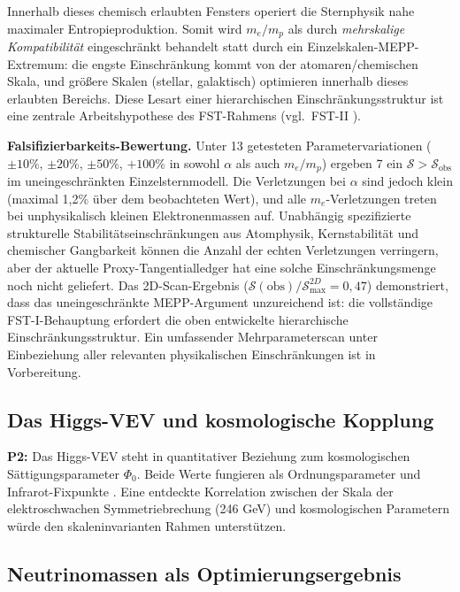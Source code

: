 \documentclass[12pt,a4paper]{article}
\theoremstyle{remark}
\begin{document}
Innerhalb dieses chemisch erlaubten Fensters operiert die Sternphysik nahe maximaler Entropieproduktion. Somit wird $m_e/m_p$ als durch \emph{mehrskalige Kompatibilit\"at} eingeschr\"ankt behandelt statt durch ein Einzelskalen-MEPP-Extremum: die engste Einschr\"ankung kommt von der atomaren/chemischen Skala, und gr\"o\ss{}ere Skalen (stellar, galaktisch) optimieren innerhalb dieses erlaubten Bereichs. Diese Lesart einer hierarchischen Einschr\"ankungsstruktur ist eine zentrale Arbeitshypothese des FST-Rahmens (vgl.\ FST-II \citep{FSTII}).

\textbf{Falsifizierbarkeits-Bewertung.} Unter 13 getesteten Parametervariationen ($\pm 10\%$, $\pm 20\%$, $\pm 50\%$, $+100\%$ in sowohl $\alpha$ als auch $m_e/m_p$) ergeben 7 ein $\mathcal{S} > \mathcal{S}_{\text{obs}}$ im uneingeschr\"ankten Einzelsternmodell. Die Verletzungen bei $\alpha$ sind jedoch klein (maximal 1{,}2\% \"uber dem beobachteten Wert), und alle $m_e$-Verletzungen treten bei unphysikalisch kleinen Elektronenmassen auf. Unabh\"angig spezifizierte strukturelle Stabilit\"atseinschr\"ankungen aus Atomphysik, Kernstabilit\"at und chemischer Gangbarkeit k\"onnen die Anzahl der echten Verletzungen verringern, aber der aktuelle Proxy-Tangentialledger hat eine solche Einschr\"ankungsmenge noch nicht geliefert. Das 2D-Scan-Ergebnis ($\mathcal{S}(\text{obs})/\mathcal{S}_{\text{max}}^{2D} = 0{,}47$) demonstriert, dass das uneingeschr\"ankte MEPP-Argument unzureichend ist: die vollst\"andige FST-I-Behauptung erfordert die oben entwickelte hierarchische Einschr\"ankungsstruktur. Ein umfassender Mehrparameterscan unter Einbeziehung aller relevanten physikalischen Einschr\"ankungen ist in Vorbereitung.

\subsection{Das Higgs-VEV und kosmologische Kopplung}

\textbf{P2:} Das Higgs-VEV steht in quantitativer Beziehung zum kosmologischen S\"attigungsparameter $\Phi_0$. Beide Werte fungieren als Ordnungsparameter und Infrarot-Fixpunkte \citep{HiggsVEV2024}. Eine entdeckte Korrelation zwischen der Skala der elektroschwachen Symmetriebrechung (246 GeV) und kosmologischen Parametern w\"urde den skaleninvarianten Rahmen unterst\"utzen.

\subsection{Neutrinomassen als Optimierungsergebnis}
\end{document}
